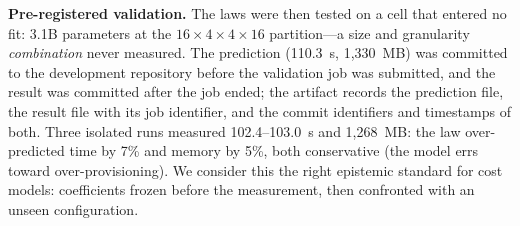 \documentclass[journal]{IEEEtran}
\begin{document}
\textbf{Pre-registered validation.} The laws were then tested on a cell
that entered no fit: 3.1B parameters at the $16{\times}4{\times}4{\times}16$
partition---a size and granularity \emph{combination} never measured. The
prediction (110.3~s, 1{,}330~MB) was committed to the development repository before the validation job
was submitted, and the result was committed after the job ended; the
artifact records the prediction file, the result file with its job
identifier, and the commit identifiers and timestamps of both. Three isolated runs measured 102.4--103.0~s and 1{,}268~MB: the law over-predicted time by 7\% and memory by 5\%, both conservative
(the model errs toward over-provisioning). We consider this the right
epistemic standard for cost models: coefficients frozen before the
measurement, then confronted with an unseen configuration.

\end{document}

